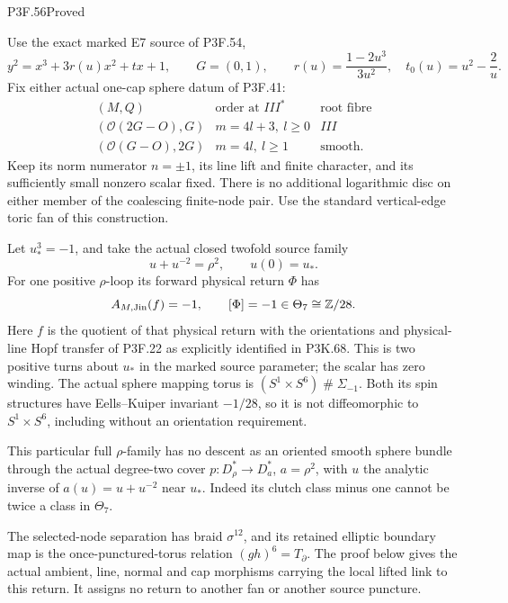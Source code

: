 \begin{statement}{P3F.56}{Proved}

Use the exact marked E7 source of P3F.54,
\[
 y^2=x^3+3r(u)x^2+t x+1,\qquad G=(0,1),\qquad
 r(u)=\frac{1-2u^3}{3u^2},\quad t_0(u)=u^2-\frac2u.
\]
Fix either actual one-cap sphere datum of P3F.41:
\[
 \begin{array}{c|c|c}
 (M,Q)&\text{order at }III^*&\text{root fibre}\\ \hline
 (\mathcal O(2G-O),G)&m=4l+3,\ l\ge0&III\\
 (\mathcal O(G-O),2G)&m=4l,\ l\ge1&\text{smooth}.
 \end{array}
\]
Keep its norm numerator \(n=\pm1\), its line lift and finite character,
and its sufficiently small nonzero scalar fixed. There is no additional
logarithmic disc on either member of the coalescing finite-node pair.
Use the standard vertical-edge toric fan of this construction.

Let \(u_*^3=-1\), and take the actual closed twofold source family
\[
 u+u^{-2}=\rho^2,\qquad u(0)=u_*.
\]
For one positive \(\rho\)-loop its forward physical return \(\Phi\)
has
\[
 A_{M,\rm Jin}(f)=-1,\qquad [\Phi]=-1\in\Theta_7\cong\mathbb Z/28.
\]
Here \(f\) is the quotient of that physical return with the orientations
and physical-line Hopf transfer of P3F.22 as explicitly identified in P3K.68. This is two positive turns about \(u_*\)
in the marked source parameter; the scalar has zero winding.
The actual sphere mapping torus is
\((S^1\times S^6)\mathbin{\#}\Sigma_{-1}\). Both its spin structures
have Eells--Kuiper invariant \(-1/28\), so it is not diffeomorphic to
\(S^1\times S^6\), including without an orientation requirement.

This particular full \(\rho\)-family has no descent as an oriented
smooth sphere bundle through the actual degree-two cover
\(p:D_\rho^*\to D_a^*\), \(a=\rho^2\), with \(u\) the analytic
inverse of \(a(u)=u+u^{-2}\) near \(u_*\). Indeed its clutch class
minus one cannot be twice a class in \(\Theta_7\).

The selected-node separation has braid \(\sigma^{12}\), and its
retained elliptic boundary map is the once-punctured-torus relation
\((gh)^6=T_{\partial}\). The proof below gives the actual ambient,
line, normal and cap morphisms carrying the local lifted link to this
return. It assigns no return to another fan or another source puncture.

\end{statement}
